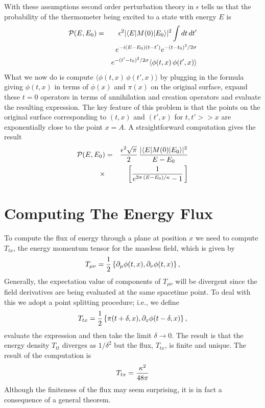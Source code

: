 \documentclass[12pt]{article}
\newcommand{\bra}[1]{\langle  {#1}  \vert }
\newcommand{\ket}[1]{\vert {#1} \rangle }
\begin{document}
With these assumptions second order perturbation theory in $\epsilon$ tells us that
the probability of the thermometer being excited to a state with energy $E$ is
\begin{eqnarray}
{\cal P}(E,E_0) &=& \epsilon^2 \vert \bra{E} M(0) \ket{E_0} \vert^2 
\int dt\,dt' \nonumber\\
&&e^{-i(E-E_0)(t-t')}  e^{-(t-t_0)^2/2\sigma} \nonumber\\
&&e^{-(t'-t_0)^2/2\sigma} \langle \phi(t,x) \, \phi(t',x)\rangle 
\end{eqnarray}
What we now do is compute $\langle \phi(t,x) \, \phi(t',x)\rangle$
by plugging in the formula giving $\phi(t,x)$ in terms of $\phi(x)$ and $\pi(x)$
on the original surface, expand these $t=0$ operators in
terms of annihilation and creation operators
and evaluate the resulting expression.  The key feature of this
problem is that the points on the original surface corresponding to
$(t,x)$ and $(t',x)$ for $t,t' >> x$ are exponentially close to the point
$x=A$.  A straightforward computation gives the result
\begin{eqnarray}
{\cal P}(E,E_0) &=&  {\epsilon^2 \sqrt{\pi} \over 2}\,
{\vert \bra{E} M(0) \ket{E_0} \vert^2 \over E-E_0} \nonumber\\
\times &&\left[ {1 \over e^{2\pi\,(E-E_0)/\kappa} -1} \,\right]
\end{eqnarray}

\section{Computing The Energy Flux}

To compute the flux of energy through a plane at position $x$ we need to compute $T_{tx}$,
the energy momentum tensor for the massless field, which is given by
\begin{equation}
T_{\mu \nu} = {1 \over 2} \left\{ \partial_\mu \phi(t,x), \partial_\nu \phi(t,x) \right\} ,
\end{equation}
Generally, the expectation value of components of $T_{\mu \nu}$ will be divergent
since the field derivatives are being evaluated at the same spacetime point.
To deal with this we adopt a point splitting procedure; i.e., we define
\begin{equation}
T_{tx} = {1 \over 2} \left\{ \pi(t+\delta,x), \partial_x \phi(t-\delta,x) \right\} ,
\end{equation}
evaluate the expression and then take the limit $\delta \rightarrow 0$.
The result is that the energy density $T_{tt}$ diverges
as $1/\delta^2$ but the flux, $T_{tx}$, is finite and unique.
The result of  the computation is
\begin{equation}
T_{tx} = {\kappa^2 \over 48 \pi}
\end{equation}
Although the finiteness of the flux may seem surprising, it is
in fact a consequence of a general theorem.
\end{document}
